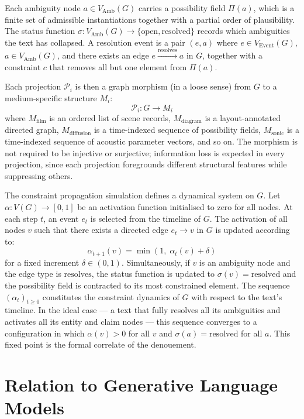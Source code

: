 \documentclass[12pt, a4paper]{article}
\begin{document}
Each ambiguity node $a \in V_{\text{Amb}}(G)$ carries a possibility field $\Pi(a)$, which is a finite set of admissible instantiations together with a partial order of plausibility. The status function $\sigma : V_{\text{Amb}}(G) \to \{\text{open}, \text{resolved}\}$ records which ambiguities the text has collapsed. A resolution event is a pair $(e, a)$ where $e \in V_{\text{Event}}(G)$, $a \in V_{\text{Amb}}(G)$, and there exists an edge $e \xrightarrow{\text{resolves}} a$ in $G$, together with a constraint $c$ that removes all but one element from $\Pi(a)$.

Each projection $\mathcal{P}_i$ is then a graph morphism (in a loose sense) from $G$ to a medium-specific structure $M_i$:
\[
\mathcal{P}_i : G \longrightarrow M_i
\]
where $M_{\text{film}}$ is an ordered list of scene records, $M_{\text{diagram}}$ is a layout-annotated directed graph, $M_{\text{diffusion}}$ is a time-indexed sequence of possibility fields, $M_{\text{sonic}}$ is a time-indexed sequence of acoustic parameter vectors, and so on. The morphism is not required to be injective or surjective; information loss is expected in every projection, since each projection foregrounds different structural features while suppressing others.

The constraint propagation simulation defines a dynamical system on $G$. Let $\alpha : V(G) \to [0, 1]$ be an activation function initialised to zero for all nodes. At each step $t$, an event $e_t$ is selected from the timeline of $G$. The activation of all nodes $v$ such that there exists a directed edge $e_t \to v$ in $G$ is updated according to:
\[
\alpha_{t+1}(v) = \min\!\left(1,\; \alpha_t(v) + \delta\right)
\]
for a fixed increment $\delta \in (0, 1)$. Simultaneously, if $v$ is an ambiguity node and the edge type is $\text{resolves}$, the status function is updated to $\sigma(v) = \text{resolved}$ and the possibility field is contracted to its most constrained element. The sequence $(\alpha_t)_{t \geq 0}$ constitutes the constraint dynamics of $G$ with respect to the text's timeline. In the ideal case — a text that fully resolves all its ambiguities and activates all its entity and claim nodes — this sequence converges to a configuration in which $\alpha(v) > 0$ for all $v$ and $\sigma(a) = \text{resolved}$ for all $a$. This fixed point is the formal correlate of the denouement.

\section{Relation to Generative Language Models}
\end{document}
